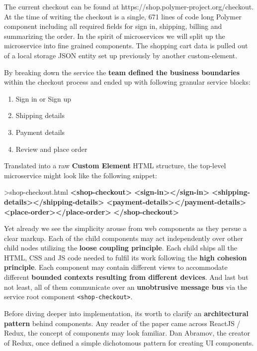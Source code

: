 \documentclass[]{article}
\newenvironment{Shaded}{}{}
\newcommand{\KeywordTok}[1]{\textcolor[rgb]{0.00,0.44,0.13}{\textbf{{#1}}}}
\newcommand{\NormalTok}[1]{{#1}}
\providecommand{\tightlist}{%
  \setlength{\itemsep}{0pt}\setlength{\parskip}{0pt}}
\begin{document}
The current checkout can be found at
https://shop.polymer-project.org/checkout. At the time of writing the
checkout is a single, 671 lines of code long Polymer component including
all required fields for sign in, shipping, billing and summarizing the
order. In the spirit of microservices we will split up the microservice
into fine grained components. The shopping cart data is pulled out of a
local storage JSON entity set up previously by another custom-element.

By breaking down the service the \textbf{team defined the business
boundaries} within the checkout process and ended up with following
granular service blocks:

\begin{enumerate}
\def\labelenumi{\arabic{enumi}.}
\tightlist
\item
  Sign in or Sign up
\item
  Shipping details
\item
  Payment details
\item
  Review and place order
\end{enumerate}

Translated into a raw \textbf{Custom Element} HTML structure, the
top-level microservice might look like the following snippet:

\begin{Shaded}
\begin{Highlighting}[]
\NormalTok{>shop-checkout.html}
\KeywordTok{<shop-checkout>}
  \KeywordTok{<sign-in></sign-in>}
  \KeywordTok{<shipping-details></shipping-details>}
  \KeywordTok{<payment-details></payment-details>}
  \KeywordTok{<place-order></place-order>}
\KeywordTok{</shop-checkout>}
\end{Highlighting}
\end{Shaded}

Yet already we see the simplicity arouse from web components as they
persue a clear markup. Each of the child components may act
independently over other child nodes utilizing the \textbf{loose
coupling principle}. Each child ships all the HTML, CSS and JS code
needed to fulfil its work following the \textbf{high cohesion
principle}. Each component may contain different views to accommodate
different \textbf{bounded contexts resulting from different devices}.
And last but not least, all of them communicate over an
\textbf{unobtrusive message bus} via the service root component
\texttt{\textless{}shop-checkout\textgreater{}}.

Before diving deeper into implementation, its worth to clarify an
\textbf{architectural pattern} behind components. Any reader of the
paper came across ReactJS / Redux, the concept of components may look
familiar. Dan Abramov, the creator of Redux, once defined a simple
dichotomous pattern for creating UI components.
\end{document}
